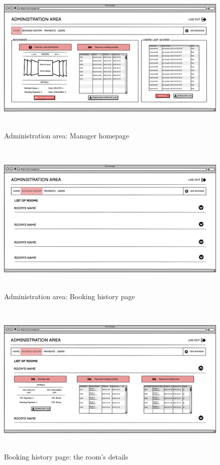 \begin{figure}[H]
	\centering
	\includegraphics[height=7.5cm]{images/manager-index.png} 
	\caption{Administration area: Manager homepage}
\end{figure}
\begin{figure}[H]
	\centering
	\includegraphics[height=7.5cm]{images/admin-booking-hist.png} 
	\caption{Administration area: Booking history page}
\end{figure}
\begin{figure}[H]
	\centering
	\includegraphics[height=7.5cm]{images/admin-details-room.png} 
	\caption{Booking history page: the room's details}
\end{figure}
